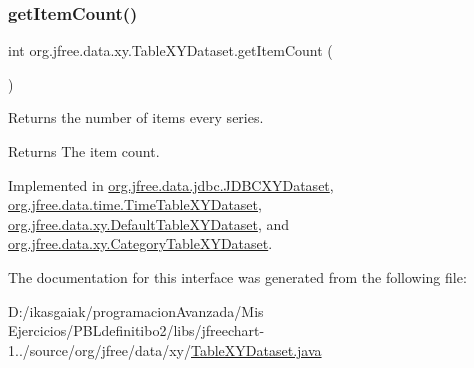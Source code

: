 \subsubsection{\texorpdfstring{get\+Item\+Count()}{getItemCount()}}
{\footnotesize\ttfamily int org.\+jfree.\+data.\+xy.\+Table\+X\+Y\+Dataset.\+get\+Item\+Count (\begin{DoxyParamCaption}{ }\end{DoxyParamCaption})}

Returns the number of items every series.

\begin{DoxyReturn}{Returns}
The item count. 
\end{DoxyReturn}


Implemented in \mbox{\hyperlink{classorg_1_1jfree_1_1data_1_1jdbc_1_1_j_d_b_c_x_y_dataset_aa347adfad669f076de8dbb6793441f15}{org.\+jfree.\+data.\+jdbc.\+J\+D\+B\+C\+X\+Y\+Dataset}}, \mbox{\hyperlink{classorg_1_1jfree_1_1data_1_1time_1_1_time_table_x_y_dataset_ad80a7fca84f962b49d80b1c1f4f745a4}{org.\+jfree.\+data.\+time.\+Time\+Table\+X\+Y\+Dataset}}, \mbox{\hyperlink{classorg_1_1jfree_1_1data_1_1xy_1_1_default_table_x_y_dataset_a6f40c4ca3cfcf021f6be3ffd1978ba82}{org.\+jfree.\+data.\+xy.\+Default\+Table\+X\+Y\+Dataset}}, and \mbox{\hyperlink{classorg_1_1jfree_1_1data_1_1xy_1_1_category_table_x_y_dataset_ae1129096e67aae2724cfe36586062443}{org.\+jfree.\+data.\+xy.\+Category\+Table\+X\+Y\+Dataset}}.



The documentation for this interface was generated from the following file\+:\begin{DoxyCompactItemize}
\item 
D\+:/ikasgaiak/programacion\+Avanzada/\+Mis Ejercicios/\+P\+B\+Ldefinitibo2/libs/jfreechart-\/1../source/org/jfree/data/xy/\mbox{\hyperlink{_table_x_y_dataset_8java}{Table\+X\+Y\+Dataset.\+java}}\end{DoxyCompactItemize}
